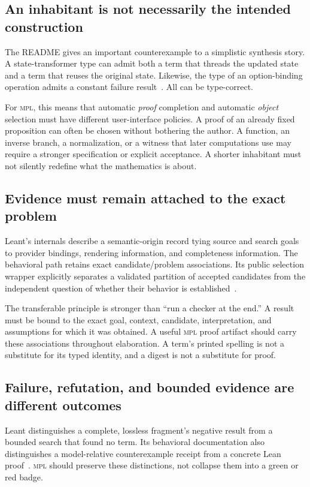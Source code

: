 \documentclass[11pt,a4paper]{article}
\newcommand{\MPL}{\textnormal{\textsc{mpl}}}
\theoremstyle{remark}
\begin{document}
\subsection{An inhabitant is not necessarily the intended construction}

The README gives an important counterexample to a simplistic synthesis story. A state-transformer type can admit both a term that threads the updated state and a term that reuses the original state. Likewise, the type of an option-binding operation admits a constant failure result~\cite{leant-readme}. All can be type-correct.

For \MPL{}, this means that automatic \emph{proof} completion and automatic \emph{object} selection must have different user-interface policies. A proof of an already fixed proposition can often be chosen without bothering the author. A function, an inverse branch, a normalization, or a witness that later computations use may require a stronger specification or explicit acceptance. A shorter inhabitant must not silently redefine what the mathematics is about.

\subsection{Evidence must remain attached to the exact problem}

Leant's internals describe a semantic-origin record tying source and search goals to provider bindings, rendering information, and completeness information. The behavioral path retains exact candidate/problem associations. Its public selection wrapper explicitly separates a validated partition of accepted candidates from the independent question of whether their behavior is established~\cite{leant-internals,leant-selection}.

The transferable principle is stronger than ``run a checker at the end.'' A result must be bound to the exact goal, context, candidate, interpretation, and assumptions for which it was obtained. A useful \MPL{} proof artifact should carry these associations throughout elaboration. A term's printed spelling is not a substitute for its typed identity, and a digest is not a substitute for proof.

\subsection{Failure, refutation, and bounded evidence are different outcomes}

Leant distinguishes a complete, lossless fragment's negative result from a bounded search that found no term. Its behavioral documentation also distinguishes a model-relative counterexample receipt from a concrete Lean proof~\cite{leant-readme,leant-internals}. \MPL{} should preserve these distinctions, not collapse them into a green or red badge.
\end{document}
